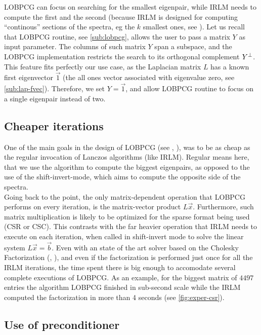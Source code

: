 \gls{LOBPCG} can focus on searching for the smallest eigenpair, while
\gls{IRLM} needs to compute the first and the 
second (because \gls{IRLM} is designed for computing ``continous''
sections of the spectra, eg the $k$ smallest ones, see
\cite{arpack}). Let us recall that 
\gls{LOBPCG} routine, see \cref{sub:lobpcg}, allows the user to pass a
matrix $Y$ as input parameter. The columns of such matrix $Y$ span a
subspace, and the \gls{LOBPCG} implementation restricts the search to its orthogonal
complement ${Y}^{\bot}$. This feature fits perfectly our use case, as 
the Laplacian matrix $L$ has a known first eigenvector $\vec{1}$ (the all
ones vector associated with eigenvalue zero, see
\cref{sub:lap-fvec}). Therefore, we set $Y = \vec{1}$,
and allow \gls{LOBPCG} routine to focus on a single eigenpair instead of two.

\subsection{Cheaper iterations}

One of the main goals in the design of \gls{LOBPCG} (see
\cite{knyazev01}, \cite{knyazev03}),
was to be as cheap as the regular invocation of Lanczos
algorithms (like \gls{IRLM}). Regular means here, that
we use the algorithm to compute the biggest eigenpairs, as opposed to
the use of the shift-invert-mode, which aims to compute the opposite
side of the spectra. \\

Going back to the point, the
only matrix-dependent operation that \gls{LOBPCG} performs on every
iteration, is the matrix-vector product $L\vec{x}$. Furthermore, such matrix
multiplication is likely to be optimized for the sparse format being
used (CSR or CSC). This contrasts with the far heavier operation that
\gls{IRLM} needs to execute on each iteration, when called in
shift-invert mode to solve the linear system $L\vec{x} =
\vec{b}$. Even with an state of the art solver based on the Cholesky
Factorization (\cite{cholmod08}, \cite{cholmod08a}), and even if
the factorization is performed just once for all the \gls{IRLM}
iterations, the time spent there is big enough to accomodate several
complete executions of \gls{LOBPCG}. As an example, for the biggest
matrix of $4497$ entries the algorithm \gls{LOBPCG} finished in
sub-second scale while the \gls{IRLM} computed the factorization in
more than 4 seconds (see \cref{fig:exper-csr}).


\subsection{Use of preconditioner}

